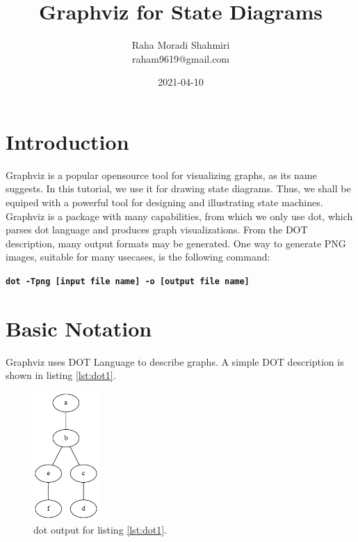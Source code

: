 \documentclass{article}
\title{Graphviz for State Diagrams}
\date{2021-04-10}
\author{Raha Moradi Shahmiri\\raham9619@gmail.com}
\begin{document}
	\maketitle
	\newpage


	\section{Introduction}
	Graphviz is a popular opensource tool for visualizing graphs, as its name suggests. In this tutorial, we use it for drawing state diagrams. Thus, we shall be equiped with a powerful tool for designing and illustrating state machines. Graphviz is a package with many capabilities, from which we only use dot, which parses dot language and produces graph visualizations. 
	\newline
	From the DOT description, many output formats may be generated. One way to generate PNG images, suitable for many usecases, is the following command:
	\newline \newline
	
	\textbf{\lstinline{dot -Tpng [input file name] -o [output file name]}}

	\section{Basic Notation}
	Graphviz uses DOT Language to describe graphs. A simple DOT description is shown in listing \ref{lst:dot1}.

	
	
	\begin{figure}[H]
		\begin{center}
			\includegraphics[width=25mm]{figure1.png}
		\end{center}
		\caption{dot output for listing \ref{lst:dot1}.}
		\label{fig:png1}
	\end{figure}
\end{document}
